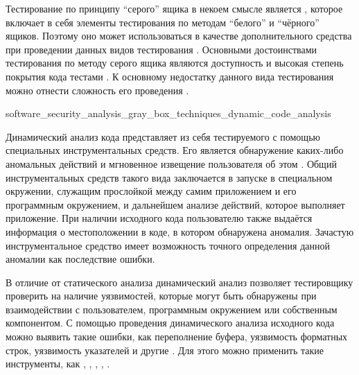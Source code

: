 %
Тестирование по принципу ``серого'' ящика в некоем смысле является , которое включает в себя элементы тестирования по методам ``белого'' и ``чёрного'' ящиков. 
%
Поэтому оно может использоваться в качестве дополнительного средства при проведении данных видов тестирования . 
%
Основными достоинствами тестирования по методу серого ящика являются доступность и высокая степень покрытия кода тестами . 
%
К основному недостатку данного вида тестирования можно отнести сложность его проведения .


	{software_security_analysis_gray_box_techniques_dynamic_code_analysis}

%
Динамический анализ кода представляет из себя  тестируемого  с помощью специальных инструментальных средств. 
%
Его  является обнаружение каких-либо аномальных действий и мгновенное извещение пользователя об этом . 
%
Общий  инструментальных средств такого вида заключается в запуске  в специальном окружении, служащим прослойкой между самим приложением и его программным окружением, и дальнейшем анализе действий, которое выполняет приложение. 
%
При наличии исходного кода пользователю также выдаётся информация о местоположении в коде, в котором обнаружена аномалия. 
%
Зачастую инструментальное средство имеет возможность точного определения данной аномалии как последствие ошибки.

В отличие от статического анализа динамический анализ позволяет тестировщику проверить  на наличие уязвимостей, которые могут быть обнаружены при взаимодействии с пользователем, программным окружением или собственным компонентом. 
%
С помощью проведения динамического анализа исходного кода можно выявить такие ошибки, как переполнение буфера, уязвимость форматных строк, уязвимость указателей и другие . 
%
Для этого можно применить такие инструменты, как  ,  ,  ,  ,  .

